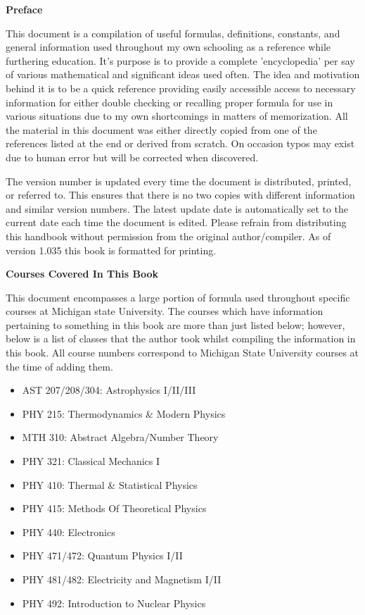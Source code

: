 \begin{center}
	\textbf{Preface}
\end{center}

This document is a compilation of useful formulas, definitions, constants, and general information used throughout my own schooling as a reference while furthering education. It's purpose is to provide a complete 'encyclopedia' per say of various mathematical and significant ideas used often. The idea and motivation behind it is to be a quick reference providing easily accessible access to necessary information for either double checking or recalling proper formula for use in various situations due to my own shortcomings in matters of memorization. All the material in this document was either directly copied from one of the references listed at the end or derived from scratch. On occasion typos may exist due to human error but will be corrected when discovered.
	
The version number is updated every time the document is distributed, printed, or referred to. This ensures that there is no two copies with different information and similar version numbers. The latest update date is automatically set to the current date each time the document is edited. Please refrain from distributing this handbook without permission from the original author/compiler. As of version 1.035 this book is formatted for printing.

\begin{center}
	\textbf{Courses Covered In This Book}
\end{center}

This document encompasses a large portion of formula used throughout specific courses at Michigan state University. The courses which have information pertaining to something in this book are more than just listed below; however, below is a list of classes that the author took whilst compiling the information in this book. All course numbers correspond to Michigan State University courses at the time of adding them. 

\begin{multicols}{2}
\begin{itemize}
	\item AST 207/208/304: Astrophysics I/II/III
	\item PHY 215: Thermodynamics \& Modern Physics
	\item MTH 310: Abstract Algebra/Number Theory
	\item PHY 321: Classical Mechanics I
	\item PHY 410: Thermal \& Statistical Physics
	\item PHY 415: Methods Of Theoretical Physics
	\item PHY 440: Electronics
	\item PHY 471/472: Quantum Physics I/II
	\item PHY 481/482: Electricity and Magnetism I/II
	\item PHY 492: Introduction to Nuclear Physics
\end{itemize} 
\end{multicols}

